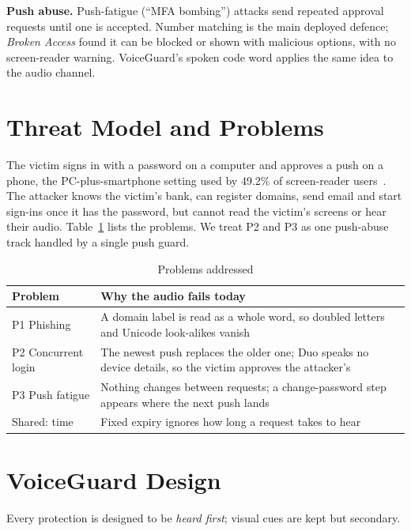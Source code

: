 \documentclass[conference]{IEEEtran}
\begin{document}
\textbf{Push abuse.} Push-fatigue (``MFA bombing'') attacks send repeated approval requests until one is accepted. Number matching is the main deployed defence; \emph{Broken Access} found it can be blocked or shown with malicious options, with no screen-reader warning. VoiceGuard's spoken code word applies the same idea to the audio channel.

\section{Threat Model and Problems}

The victim signs in with a password on a computer and approves a push on a phone, the PC-plus-smartphone setting used by 49.2\% of screen-reader users~\cite{brokenaccess}. The attacker knows the victim's bank, can register domains, send email and start sign-ins once it has the password, but cannot read the victim's screens or hear their audio. Table~\ref{tab:problems} lists the problems. We treat P2 and P3 as one push-abuse track handled by a single push guard.

\begin{table}[t]
\caption{Problems addressed}
\label{tab:problems}
\footnotesize
\begin{tabularx}{\columnwidth}{@{}p{1.45cm}X@{}}
\toprule
Problem & Why the audio fails today \\
\midrule
P1 Phishing & A domain label is read as a whole word, so doubled letters and Unicode look-alikes vanish \\
P2 Concurrent login & The newest push replaces the older one; Duo speaks no device details, so the victim approves the attacker's \\
P3 Push fatigue & Nothing changes between requests; a change-password step appears where the next push lands \\
Shared: time & Fixed expiry ignores how long a request takes to hear \\
\bottomrule
\end{tabularx}
\end{table}

\section{VoiceGuard Design}

Every protection is designed to be \emph{heard first}; visual cues are kept but secondary.
\end{document}
